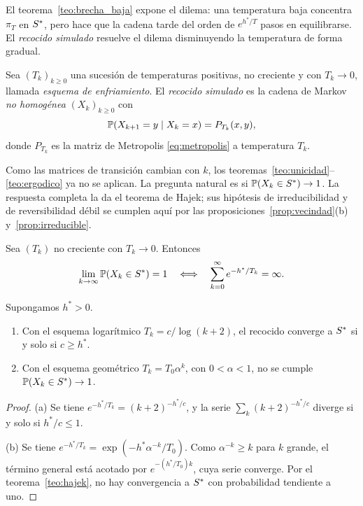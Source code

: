 El teorema~\ref{teo:brecha_baja} expone el dilema: una temperatura baja
concentra \(\pi_T\) en \(S^{\ast}\), pero hace que la cadena tarde del
orden de \(e^{h^\ast/T}\) pasos en equilibrarse. El \emph{recocido
simulado} \citep{kirkpatrick1983,cerny1985} resuelve el dilema
disminuyendo la temperatura de forma gradual.

\begin{definicion}
\label{def:recocido}
Sea \((T_k)_{k\ge0}\) una sucesión de temperaturas positivas, no
creciente y con \(T_k\to0\), llamada \emph{esquema de enfriamiento}. El
\emph{recocido simulado} es la cadena de Markov \emph{no homogénea}
\((X_k)_{k\ge 0}\) con
\[
\mathbb{P}(X_{k+1}=y\mid X_k=x)=P_{T_k}(x,y),
\]
donde \(P_{T_k}\) es la matriz de Metropolis \eqref{eq:metropolis} a
temperatura \(T_k\).
\end{definicion}

Como las matrices de transición cambian con \(k\), los
teoremas~\ref{teo:unicidad}--\ref{teo:ergodico} ya no se aplican. La
pregunta natural es si \(\mathbb{P}(X_k\in S^{\ast})\to1\). La respuesta
completa la da el teorema de Hajek; sus hipótesis de irreducibilidad y
de reversibilidad débil se cumplen aquí por las
proposiciones~\ref{prop:vecindad}(b) y~\ref{prop:irreducible}.

\begin{teorema}
\label{teo:hajek}
Sea \((T_k)\) no creciente con \(T_k\to0\). Entonces
\[
\lim_{k\to\infty}\mathbb{P}(X_k\in S^{\ast})=1
\quad\Longleftrightarrow\quad
\sum_{k=0}^{\infty}e^{-h^\ast/T_k}=\infty.
\]
\end{teorema}

\begin{corolario}
\label{cor:enfriamiento}
Supongamos \(h^\ast>0\).
\begin{enumerate}[label=(\alph*)]
    \item Con el esquema logarítmico \(T_k=c/\log(k+2)\), el recocido
    converge a \(S^{\ast}\) si y solo si \(c\ge h^\ast\).
    \item Con el esquema geométrico \(T_k=T_0\alpha^k\), con
    \(0<\alpha<1\), no se cumple \(\mathbb{P}(X_k\in S^{\ast})\to1\).
\end{enumerate}
\end{corolario}

\begin{proof}
(a) Se tiene \(e^{-h^\ast/T_k}=(k+2)^{-h^\ast/c}\), y la serie
\(\sum_k (k+2)^{-h^\ast/c}\) diverge si y solo si \(h^\ast/c\le1\).

(b) Se tiene \(e^{-h^\ast/T_k}=\exp(-h^\ast\alpha^{-k}/T_0)\). Como
\(\alpha^{-k}\ge k\) para \(k\) grande, el término general está acotado
por \(e^{-(h^\ast/T_0)k}\), cuya serie converge. Por el
teorema~\ref{teo:hajek}, no hay convergencia a \(S^{\ast}\) con
probabilidad tendiente a uno.
\end{proof}

